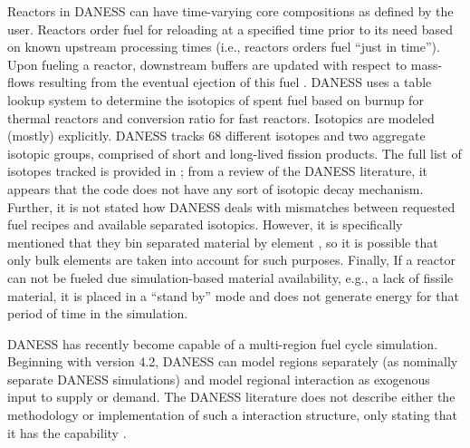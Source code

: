 Reactors in DANESS can have time-varying core compositions as defined by the
user. Reactors order fuel for reloading at a specified time prior to its need
based on known upstream processing times (i.e., reactors orders fuel ``just in
time''). Upon fueling a reactor, downstream buffers are updated with respect to
mass-flows resulting from the eventual ejection of this fuel
\cite{guerin_benchmark_2009}. DANESS uses a table lookup system to determine the
isotopics of spent fuel based on burnup for thermal reactors and conversion
ratio for fast reactors. Isotopics are modeled (mostly) explicitly. DANESS
tracks 68 different isotopes and two aggregate isotopic groups, comprised of
short and long-lived fission products. The full list of isotopes tracked is
provided in \cite{van_den_durpel_daness_2009}; from a review of the DANESS
literature, it appears that the code does not have any sort of isotopic decay
mechanism. Further, it is not stated how DANESS deals with mismatches between
requested fuel recipes and available separated isotopics. However, it is
specifically mentioned that they bin separated material by element
\cite{van_den_durpel_daness_2009}, so it is possible that only bulk elements are
taken into account for such purposes. Finally, If a reactor can not be fueled
due simulation-based material availability, e.g., a lack of fissile material, it
is placed in a ``stand by'' mode and does not generate energy for that period of
time in the simulation.

DANESS has recently become capable of a multi-region fuel cycle simulation.
Beginning with version 4.2, DANESS can model regions separately (as nominally
separate DANESS simulations) and model regional interaction as exogenous input
to supply or demand. The DANESS literature does not describe either the
methodology or implementation of such a interaction structure, only stating that
it has the capability \cite{van_den_durpel_daness_2009}.

